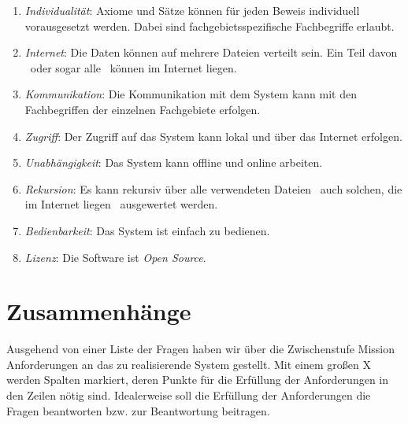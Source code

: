 \documentclass[english,ngerman,parskip=half,headsepline,footsepline]{scrreprt}
\begin{document}
\begin{enumerate}
		\item \label{Ziel:Individualität} \emph{Individualität}: Axiome und Sätze können für jeden Beweis individuell vorausgesetzt werden. Dabei sind fachgebietsspezifische Fachbegriffe erlaubt.
		
		\item \label{Ziel:Internet} \emph{Internet}: Die Daten können auf mehrere Dateien verteilt sein. Ein Teil davon \textendash\ oder sogar alle \textendash\ können im Internet liegen.
		
		\item \label{Ziel:Kommunikation} \emph{Kommunikation}: Die Kommunikation mit dem System kann mit den Fachbegriffen der einzelnen Fachgebiete erfolgen.
		
		\item \label{Ziel:Zugriff} \emph{Zugriff}: Der Zugriff auf das System kann lokal und über das Internet erfolgen.
		
		\item \label{Ziel:Unabhängigkeit} \emph{Unabhängigkeit}: Das System kann offline und online arbeiten.
		
		\item \label{Ziel:Rekursion} \emph{Rekursion}: Es kann rekursiv über alle verwendeten Dateien \textendash\ auch solchen, die im Internet liegen \textendash\ ausgewertet werden.
		
		\item \label{Ziel:Bedienbarkeit} \emph{Bedienbarkeit}: Das System ist einfach zu bedienen.
		
		\item \label{Ziel:Lizenz} \emph{Lizenz}: Die Software ist \emph{Open Source}.
	\end{enumerate}
	
	\section{Zusammenhänge}
	\label{sec:Zusammenhänge}
	Ausgehend von einer Liste der Fragen haben wir über die Zwischenstufe Mission Anforderungen an das zu realisierende System gestellt. Mit einem großen X werden Spalten markiert, deren Punkte für die Erfüllung der Anforderungen in den Zeilen nötig sind. Idealerweise soll die Erfüllung der Anforderungen die Fragen beantworten bzw. zur Beantwortung beitragen.\vspace{12pt}
	
\end{document}
